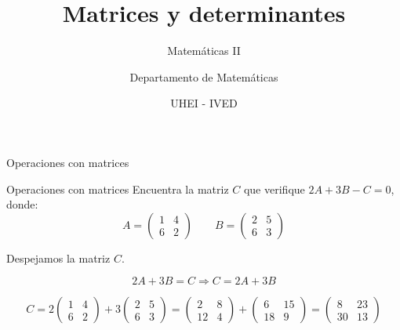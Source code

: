 \documentclass[8pt]{beamer}
\title{Matrices y determinantes}
\subtitle{Matemáticas II}
\author{Departamento de Matemáticas}
\date[UHEI-IVED]{ UHEI - IVED}
\begin{document}
\titleframe
\begin{frame}[t]{Operaciones con matrices}
\
\begin{exampleblock}{Operaciones con matrices}
Encuentra la matriz $C$ que verifique $2A + 3B - C =0$, donde: 
\[ A= \begin{pmatrix}
1 & 4 \\ 6 & 2
\end{pmatrix} \qquad B=\begin{pmatrix}
2 & 5 \\ 6 & 3
\end{pmatrix}
\]
\end{exampleblock}

\pause
Despejamos la matriz $C$. 

\[ 2A+3B=C \Rightarrow C=2A+3B \]

\pause
\[ C= 2 \begin{pmatrix}
1 & 4 \\ 6 & 2
\end{pmatrix} +3\begin{pmatrix}
2 & 5 \\ 6 & 3
\end{pmatrix} = \begin{pmatrix}
2 & 8 \\ 12 & 4
\end{pmatrix} +\begin{pmatrix}
6 & 15 \\ 18 & 9
\end{pmatrix} = \begin{pmatrix}
8 & 23 \\ 30 & 13
\end{pmatrix} \]

\pause
{}
\end{frame}
\end{document}
